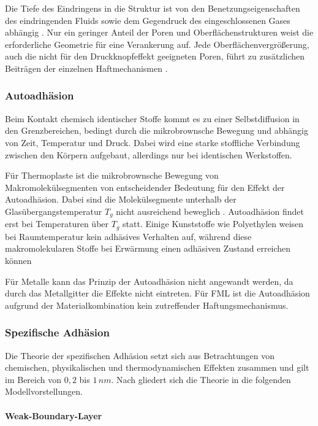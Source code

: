 Die Tiefe des Eindringens in die Struktur ist von den Benetzungseigenschaften des eindringenden Fluids sowie dem Gegendruck des eingeschlossenen Gases abhängig \cite{Mittal.1999}. Nur ein geringer Anteil der Poren und Oberflächenstrukturen weist die erforderliche Geometrie für eine Verankerung auf.  
Jede Oberflächenvergrößerung, auch die nicht für den Druckknopfeffekt geeigneten Poren, führt zu zusätzlichen Beiträgen der einzelnen Haftmechanismen \cite{Flock.b}.

\subsubsection{Autoadhäsion}\label{sec:autoadhäsion}

Beim Kontakt chemisch identischer Stoffe kommt es zu einer Selbstdiffusion in den Grenzbereichen, bedingt durch die mikrobrownsche Bewegung und abhängig von Zeit, Temperatur und Druck. Dabei wird eine starke stoffliche Verbindung zwischen den Körpern aufgebaut, allerdings nur bei identischen Werkstoffen.

Für Thermoplaste ist die mikrobrownsche Bewegung von Makromolekülsegmenten von entscheidender Bedeutung für den Effekt der Autoadhäsion. Dabei sind die Molekülsegmente unterhalb der Glasübergangstemperatur $T_g$ nicht ausreichend beweglich \cite{SEIDLER.1971}. Autoadhäsion findet erst bei Temperaturen über $T_g$ statt. Einige Kunststoffe wie Polyethylen weisen bei Raumtemperatur kein adhäsives Verhalten auf, während diese makromolekularen Stoffe bei Erwärmung einen adhäsiven Zustand erreichen können \cite{SEIDLER.1971}

Für Metalle kann das Prinzip der Autoadhäsion nicht angewandt werden, da durch das Metallgitter die Effekte nicht eintreten. Für FML ist die Autoadhäsion aufgrund der Materialkombination kein zutreffender Haftungsmechanismus. \cite{Flock.b}

\subsubsection{Spezifische Adhäsion}\label{sec:spez}

Die Theorie der spezifischen Adhäsion setzt sich aus Betrachtungen von chemischen, physikalischen und thermodynamischen Effekten zusammen und gilt im Bereich von $0,2$ bis $1\,nm$. Nach \cite{Garbassi.1998} gliedert sich die Theorie in die folgenden Modellvorstellungen.

\paragraph{Weak-Boundary-Layer}

